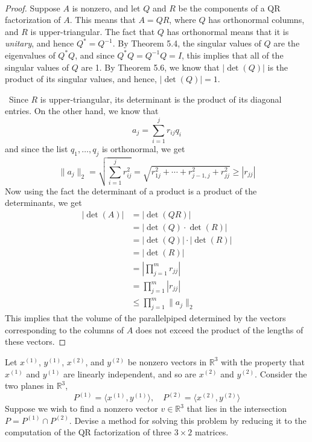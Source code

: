 \documentclass[12pt]{article}
\newenvironment{ex}[2][Exercise]{\begin{trivlist}
		\item[\hskip \labelsep {\bfseries #1}\hskip \labelsep {\bfseries #2.}]}{\end{trivlist}}
\newenvironment{sol}[1][Solution]{\begin{trivlist}
		\item[\hskip \labelsep {\bfseries #1:}]}{\end{trivlist}}
\begin{document}
\begin{sol}
	\
	\begin{proof}
		Suppose $A$ is nonzero, and let $Q$ and $R$ be the components of a QR factorization of $A$.
		This means that $A=QR$, where $Q$ has orthonormal columns, and $R$ is upper-triangular.
		The fact that $Q$ has orthonormal means that it is \emph{unitary}, and hence $Q^*=Q^{-1}$.
		By Theorem 5.4, the singular values of $Q$ are the eigenvalues of $Q^*Q$, and since $Q^*Q=Q^{-1}Q=I$,
		this implies that all of the singular values of $Q$ are 1. By Theorem 5.6,
		we know that $|\det(Q)|$ is the product of its singular values, and hence, $|\det(Q)|=1$.
		
		\
		Since $R$ is upper-triangular, its determinant is the product of its diagonal entries.
		On the other hand, we know that
		\[
		a_{j}=\sum_{i=1}^{j}r_{ij}q_i
		\]
		and since the list $q_1,\ldots,q_j$ is orthonormal, we get
		\[
		\lVert a_j\rVert_2=\sqrt{\sum_{i=1}^{j}r_{ij}^2}=\sqrt{r_{1j}^2+\cdots+r_{j-1,j}^2+r_{jj}^2}\geq |r_{jj}|
		\]
		Now using the fact the determinant of a product is a product of the determinants, we get
		\begin{align*}
			|\det(A)|&=|\det(QR)|\\
			&=|\det(Q)\cdot \det(R)|\\
			&=|\det(Q)|\cdot |\det (R)|\\
			&=|\det(R)|\\
			&=\left|\prod_{j=1}^{m}r_{jj}\right|\\
			&=\prod_{j=1}^{m}|r_{jj}|\\
			&\leq\prod_{j=1}^{m}\lVert a_j\rVert_2
		\end{align*}
		This implies that the volume of the parallelpiped determined by the vectors corresponding to the
		columns of $A$ does not exceed the product of the lengths of these vectors.
	\end{proof}
\end{sol}

\begin{ex}{4}
	Let $x^{(1)}$, $y^{(1)}$, $x^{(2)}$, and $y^{(2)}$ be nonzero vectors in $\mathbb{R}^3$ with the property
	that $x^{(1)}$ and $y^{(1)}$ are linearly independent, and so are $x^{(2)}$ and $y^{(2)}$. Consider the
	two planes in $\mathbb{R}^3$,
	\[
	P^{(1)}=\langle x^{(1)}, y^{(1)}\rangle,
	\quad
	P^{(2)}=\langle x^{(2)}, y^{(2)}\rangle
	\]
	Suppose we wish to find a nonzero vector $v\in\mathbb{R}^3$ that lies in the intersection $P=P^{(1)}\cap P^{(2)}$.
	Devise a method for solving this problem by reducing it to the computation of the QR factorization of
	three $3\times 2$ matrices.
\end{ex}
\end{document}

